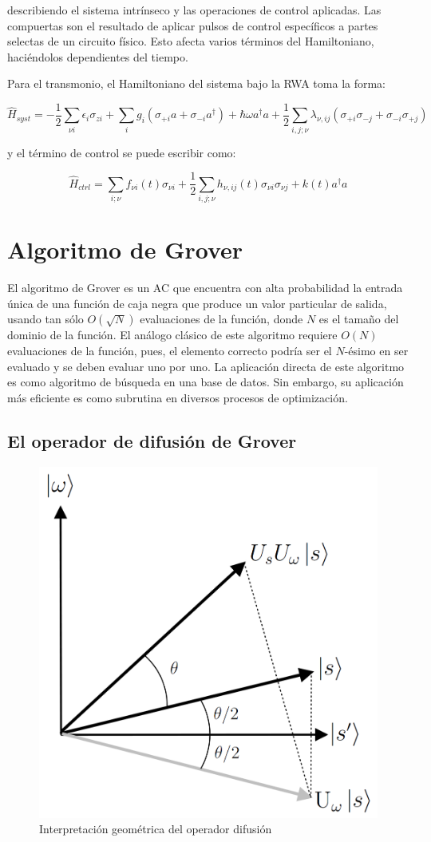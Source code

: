 \documentclass[11pt, spanish]{report}
\begin{document}
describiendo el sistema intrínseco y las operaciones de control aplicadas. Las compuertas son el resultado de aplicar pulsos de control específicos a partes selectas de un circuito físico. Esto afecta varios términos del Hamiltoniano, haciéndolos dependientes del tiempo.

Para el transmonio, el Hamiltoniano del sistema bajo la RWA toma la forma:

\[
\hat{H}_{syst} = -\frac{1}{2} \sum\limits_{\nu i} \epsilon_i \sigma_{z i} + \sum\limits_{i} g_i (\sigma_{+ i} a + \sigma_{- i} a^\dag) + \hbar \omega a^\dag a + \frac{1}{2} \sum\limits_{i,j;\nu} \lambda_{\nu, ij} (\sigma_{+ i} \sigma_{- j} + \sigma_{- i} \sigma_{+ j})
\]

y el término de control se puede escribir como:

\[
\hat{H}_{ctrl} = \sum\limits_{i; \nu} f_{\nu i}(t) \sigma_{\nu i} + \frac{1}{2} \sum\limits_{i,j;\nu} h_{\nu, ij}(t) \sigma_{\nu i} \sigma_{\nu j} + k(t) a^\dag a
\]



\chapter{Algoritmo de Grover}
El algoritmo de Grover es un AC que encuentra con alta probabilidad la entrada única de una función de caja negra que produce un valor particular de salida, usando tan sólo $O(\sqrt{N})$ evaluaciones de la función, donde $N$ es el tamaño del dominio de la función. El análogo clásico de este algoritmo requiere $O(N)$ evaluaciones de la función, pues, el elemento correcto podría ser el $N$-ésimo en ser evaluado y se deben evaluar uno por uno. La aplicación directa de este algoritmo es como algoritmo de búsqueda en una base de datos. Sin embargo, su aplicación más eficiente es como subrutina en diversos procesos de optimización.

\section{El operador de difusión de Grover}

\begin{figure}[H]
\centering \includegraphics[width=0.3\linewidth]{Grover/grover_geometry.png}
\caption{Interpretación geométrica del operador difusión}
\end{figure}
\end{document}
